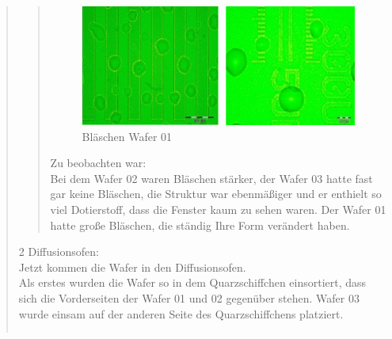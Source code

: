\begin{quote}
\begin{quote}
     	\vspace{2em}
            
    		\begin{figure}[H]
				\hspace{3.5 cm}
                \includegraphics[scale=0.5, trim = 0cm 0cm 0cm 0cm,clip]
                	{./HerstellungBilder/Mikroskopbild2.png}
                  \caption{Bläschen Wafer 01}
                \label{fig:blaes}
            \end{figure}
      
     	\vspace{2em}
     
    	Zu beobachten war:\\
		Bei dem Wafer 02 waren Bläschen stärker, der Wafer 03 hatte fast gar 
		keine Bläschen, die Struktur war ebenmäßiger und er enthielt so viel 
		Dotierstoff, dass die Fenster kaum zu sehen waren. Der Wafer 01 hatte 
		große Bläschen, die ständig Ihre Form verändert haben.
            
		\end{quote}
	
		2 Diffusionsofen:\\

		Jetzt kommen die Wafer in den Diffusionsofen.\\
	
		Als erstes wurden die Wafer  so in dem Quarzschiffchen einsortiert, dass 
		sich die Vorderseiten der Wafer 01 und 02 gegenüber stehen. Wafer 03 
		wurde einsam auf der anderen Seite des Quarzschiffchens platziert.
	
		\vspace{2em}
    
    	\begin{center}
                \begin{tabular}{ll}


\end{tabular}
\end{center}
\end{quote}
